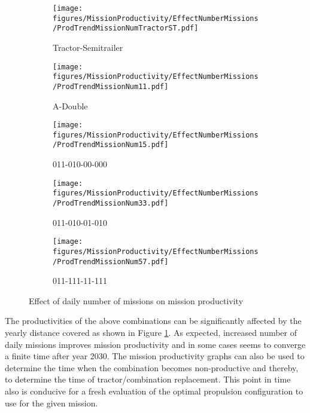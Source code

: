 \documentclass[ExampleMasters.tex]{subfiles}
\begin{document}
	\begin{figure}
		\begin{subfigure}{.5\textwidth}
			\centering
			\texttt{[image: figures/MissionProductivity/EffectNumberMissions/ProdTrendMissionNumTractorST.pdf]}
			\caption{Tractor-Semitrailer}
		\end{subfigure}
		\begin{subfigure}{.5\textwidth}
			\centering
			\texttt{[image: figures/MissionProductivity/EffectNumberMissions/ProdTrendMissionNum11.pdf]}
			\caption{A-Double}
		\end{subfigure}
		\begin{subfigure}{.5\textwidth}
			\centering
			\texttt{[image: figures/MissionProductivity/EffectNumberMissions/ProdTrendMissionNum15.pdf]}
			\caption{011-010-00-000}
		\end{subfigure}
		\begin{subfigure}{.5\textwidth}
			\centering
			\texttt{[image: figures/MissionProductivity/EffectNumberMissions/ProdTrendMissionNum33.pdf]}
			\caption{011-010-01-010}
		\end{subfigure}
		\begin{subfigure}{.5\textwidth}
			\centering
			\texttt{[image: figures/MissionProductivity/EffectNumberMissions/ProdTrendMissionNum57.pdf]}
			\caption{011-111-11-111}
		\end{subfigure}
		\caption{Effect of daily number of missions on mission productivity}
		\label{ProdNumMissions}
	\end{figure} 

	
	The productivities of the above combinations can be significantly affected by the yearly distance covered as shown in Figure \ref{ProdNumMissions}. As expected, increased number of daily missions improves mission productivity and in some cases seems to converge a finite time after year 2030. The mission productivity graphs can also be used to determine the time when the combination becomes non-productive and thereby, to determine the time of tractor/combination replacement. This point in time also is conducive for a fresh evaluation of the optimal propulsion configuration to use for the given mission.\\
\end{document}
